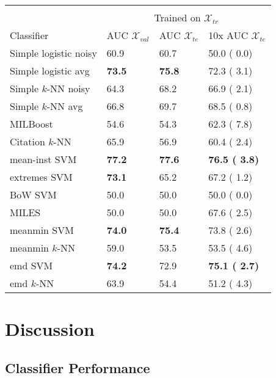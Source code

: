 \documentclass[10pt,conference,a4paper]{IEEEtran}
\begin{document}
\begin{table}[ht]
\begin{center}
\begin{tabular}{l l l l}
& & & \\



 & \multicolumn{3}{c}{Trained on $\mathcal{X}_{tr}$} \\


                    Classifier &    AUC $\mathcal{X}_{val}$ & AUC $\mathcal{X}_{te}$ & 10x AUC $\mathcal{X}_{te}$ \\
 \hline

Simple logistic noisy & 60.9 & 60.7 & 50.0 ( 0.0) \\
Simple logistic avg   & {\bf 73.5 }& {\bf 75.8 }& 72.3 ( 3.1)\\
Simple $k$-NN noisy     & 64.3 &  68.2 &  66.9 ( 2.1) \\
Simple $k$-NN avg       & 66.8 & 69.7 & 68.5 ( 0.8) \\
MILBoost & 54.6 & 54.3 & 62.3 ( 7.8) \\
Citation $k$-NN & 65.9 & 56.9 & 60.4 ( 2.4) \\
mean-inst SVM         & {\bf 77.2 }& {\bf 77.6 }& {\bf 76.5 ( 3.8)}\\
extremes SVM          & {\bf 73.1 }& 65.2 & 67.2 ( 1.2)\\
BoW SVM               & 50.0 & 50.0 & 50.0 ( 0.0) \\
MILES 								& 50.0 & 50.0 & 67.6 ( 2.5) \\
meanmin SVM           & {\bf 74.0 }& {\bf 75.4 }& 73.8 ( 2.6)\\
meanmin $k$-NN          & 59.0 & 53.5 & 53.5 ( 4.6) \\
emd SVM               & {\bf 74.2 }& 72.9 & {\bf 75.1 ( 2.7)}\\
emd $k$-NN              & 63.9 & 54.4 & 51.2 ( 4.3) \\




\end{tabular}
\end{center}\label{tab:res_simple}
\end{table}





\section{Discussion}\label{sec:results}

\subsection{Classifier Performance}
\end{document}
